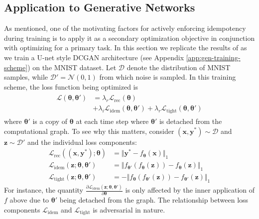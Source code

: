 \documentclass{article}
\theoremstyle{plain}
\theoremstyle{definition}
\theoremstyle{remark}
\newcommand{\vx}{\mathbf{x}}
\newcommand{\vy}{\mathbf{y}}
\newcommand{\vz}{\mathbf{z}}
\newcommand{\vtheta}{\bm{\theta}}
\newcommand{\pd}[2]{\frac{\partial{#1}}{\partial{#2}}}
\begin{document}
\subsection{Application to Generative Networks}
\label{sec:experiment-gen}
As mentioned, one of the motivating factors for actively enforcing idempotency during training is to apply it as a secondary optimization objective in conjunction with optimizing for a primary task. In this section we replicate the results of \citealt{shocher-ign} as we train a U-net style DCGAN architecture (see Appendix \ref{app:gen-training-scheme}) on the MNIST dataset. Let $\mathcal{D}$ denote the distribution of MNIST samples, while ${\mathcal{D}' = \mathcal{N}(0, 1)}$ from which noise is sampled. In this training scheme, the loss function being optimized is
%
\begin{align}
    \begin{split}
        \mathcal{L}{(\vtheta, \vtheta')} & = \lambda_r \mathcal{L}_{\mathrm{rec}}{(\vtheta)}                                                                          \\
                                         & + \lambda_i \mathcal{L}_{\mathrm{idem}}{(\vtheta, \vtheta')} + \lambda_r \mathcal{L}_{\mathrm{tight}}{(\vtheta, \vtheta')}
    \end{split}
    \label{eq:gan-loss}
\end{align}
%
where $\vtheta'$ is a copy of $\vtheta$ at each time step where $\vtheta'$ is detached from the computational graph. To see why this matters, consider $(\vx, \vy^*) \sim \mathcal{D}$ and $\vz \sim \mathcal{D}'$ and the individual loss components:
%
\begin{align}
    \mathcal{L}_{\mathrm{rec}}{((\vx, \vy^*); \vtheta)}    & = \Vert \vy^* - f_{\vtheta}(\vx) \Vert_1                            \\
    \mathcal{L}_{\mathrm{idem}}{(\vz; \vtheta, \vtheta')}  & = \Vert f_{\vtheta'}(f_{\vtheta}(\vz)) - f_{\vtheta}(\vz) \Vert_1   \\
    \mathcal{L}_{\mathrm{tight}}{(\vz; \vtheta, \vtheta')} & = -\Vert f_{\vtheta}(f_{\vtheta'}(\vz)) - f_{\vtheta'}(\vz) \Vert_1
\end{align}
%
For instance, the quantity $\pd{\mathcal{L}_{\mathrm{idem}}{(\vz; \vtheta, \vtheta')}}{\vtheta}$ is only affected by the inner application of $f$ above due to $\vtheta'$ being detached from the graph. The relationship between loss components $\mathcal{L}_{\mathrm{idem}}$ and $\mathcal{L}_{\mathrm{tight}}$ is adversarial in nature.
\end{document}
